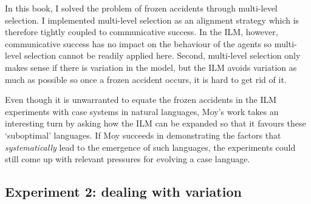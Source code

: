 In this book, I solved the problem of frozen accidents through multi-level selection. I implemented multi-level selection as an alignment strategy which is therefore tightly coupled to communicative success. In the ILM, however, communicative success has no impact on the behaviour of the agents so multi-level selection cannot be readily applied here. Second, multi-level selection only makes sense if there is variation in the model, but the ILM avoids variation as much as possible so once a frozen accident occurs, it is hard to get rid of it.

Even though it is unwarranted to equate the frozen accidents in the ILM experiments with case systems in natural languages, Moy's work takes an interesting turn by asking how the ILM can be expanded so that it favours these `suboptimal' languages. If Moy succeeds in demonstrating the factors that {\em systematically} lead to the emergence of such languages, the experiments could still come up with relevant pressures for evolving a case language.

\subsection{Experiment 2: dealing with variation}
\label{s:moy-communication}

